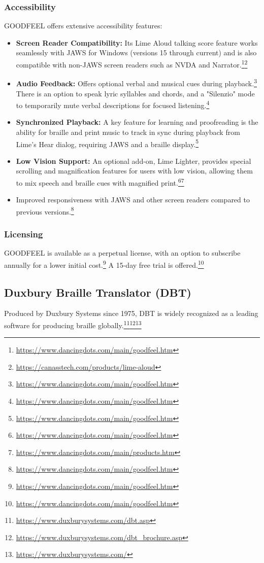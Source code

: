 \subsubsection{Accessibility}
GOODFEEL offers extensive accessibility features:
\begin{itemize}
    \item \textbf{Screen Reader Compatibility:} Its Lime Aloud talking score feature works seamlessly with JAWS for Windows (versions 15 through current) and is also compatible with non-JAWS screen readers such as NVDA and Narrator.\footnote{\url{https://www.dancingdots.com/main/goodfeel.htm}}\footnote{\url{https://canasstech.com/products/lime-aloud}}
    \item \textbf{Audio Feedback:} Offers optional verbal and musical cues during playback.\footnote{\url{https://www.dancingdots.com/main/goodfeel.htm}} There is an option to speak lyric syllables and chords, and a "Silenzio" mode to temporarily mute verbal descriptions for focused listening.\footnote{\url{https://www.dancingdots.com/main/goodfeel.htm}}
    \item \textbf{Synchronized Playback:} A key feature for learning and proofreading is the ability for braille and print music to track in sync during playback from Lime's Hear dialog, requiring JAWS and a braille display.\footnote{\url{https://www.dancingdots.com/main/goodfeel.htm}}
    \item \textbf{Low Vision Support:} An optional add-on, Lime Lighter, provides special scrolling and magnification features for users with low vision, allowing them to mix speech and braille cues with magnified print.\footnote{\url{https://www.dancingdots.com/main/goodfeel.htm}}\footnote{\url{https://www.dancingdots.com/main/products.htm}}
    \item Improved responsiveness with JAWS and other screen readers compared to previous versions.\footnote{\url{https://www.dancingdots.com/main/goodfeel.htm}}
\end{itemize}

\subsubsection{Licensing}
GOODFEEL is available as a perpetual license, with an option to subscribe annually for a lower initial cost.\footnote{\url{https://www.dancingdots.com/main/goodfeel.htm}} A 15-day free trial is offered.\footnote{\url{https://www.dancingdots.com/main/goodfeel.htm}}

\subsection{Duxbury Braille Translator (DBT)}
Produced by Duxbury Systems since 1975, DBT is widely recognized as a leading software for producing braille globally.\footnote{\url{https://www.duxburysystems.com/dbt.asp}}\footnote{\url{https://www.duxburysystems.com/dbt_brochure.asp}}\footnote{\url{https://www.duxburysystems.com/}}

